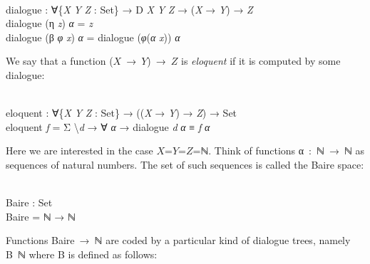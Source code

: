 \documentclass{entcs} \usepackage{prentcsmacro}
\newcommand{\AgdaC}[1]{\mbox{#1}}
\newcommand{\AgdaFontStyle}[1]{\textsf{#1}}
\newcommand{\AgdaBoundFontStyle}[1]{\textit{#1}}
\newcommand{\AgdaSymbol}      [1]{\textcolor{AgdaSymbol}{#1}}
\newcommand{\AgdaPrimitiveType}[1]
    {\AgdaFontStyle{\textcolor{AgdaPrimitiveType}{#1}}}
\newcommand{\AgdaBound}    [1]{\AgdaBoundFontStyle{\textcolor{AgdaBound}{#1}}}
\newcommand{\AgdaInductiveConstructor}[1]
    {\AgdaFontStyle{\textcolor{AgdaInductiveConstructor}{#1}}}
\newcommand{\AgdaDatatype} [1]{\AgdaFontStyle{\textcolor{AgdaDatatype}{#1}}}
\newcommand{\AgdaFunction} [1]{\AgdaFontStyle{\textcolor{AgdaFunction}{#1}}}
\newcommand{\AgdaCodeStyle}{\small}
\newenvironment{code}%
{\noindent\AgdaCodeStyle\pboxed}%
{\endpboxed\par\noindent%
\ignorespacesafterend}
\begin{document}
\begin{code}\>\<%
\\
\>\AgdaFunction{dialogue} \AgdaSymbol{:} \AgdaSymbol{∀\{}\AgdaBound{X} \AgdaBound{Y} \AgdaBound{Z} \AgdaSymbol{:} \AgdaPrimitiveType{Set}\AgdaSymbol{\}} \AgdaSymbol{→} \AgdaDatatype{D} \AgdaBound{X} \AgdaBound{Y} \AgdaBound{Z} \AgdaSymbol{→} \AgdaSymbol{(}\AgdaBound{X} \AgdaSymbol{→} \AgdaBound{Y}\AgdaSymbol{)} \AgdaSymbol{→} \AgdaBound{Z}\<%
\\
\>\AgdaFunction{dialogue} \AgdaSymbol{(}\AgdaInductiveConstructor{η} \AgdaBound{z}\AgdaSymbol{)} \<[17]%
\>[17]\AgdaBound{α} \AgdaSymbol{=} \AgdaBound{z}\<%
\\
\>\AgdaFunction{dialogue} \AgdaSymbol{(}\AgdaInductiveConstructor{β} \AgdaBound{φ} \AgdaBound{x}\AgdaSymbol{)} \AgdaBound{α} \AgdaSymbol{=} \AgdaFunction{dialogue} \AgdaSymbol{(}\AgdaBound{φ}\AgdaSymbol{(}\AgdaBound{α} \AgdaBound{x}\AgdaSymbol{))} \AgdaBound{α}\<%
\\
\>\<\end{code}
We say that a function \AgdaC{($X$ → $Y$) → $Z$} is \emph{eloquent} if
it is computed by some dialogue:

\begin{code}\>\<%
\\
\>\AgdaFunction{eloquent} \AgdaSymbol{:} \AgdaSymbol{∀\{}\AgdaBound{X} \AgdaBound{Y} \AgdaBound{Z} \AgdaSymbol{:} \AgdaPrimitiveType{Set}\AgdaSymbol{\}} \AgdaSymbol{→} \AgdaSymbol{((}\AgdaBound{X} \AgdaSymbol{→} \AgdaBound{Y}\AgdaSymbol{)} \AgdaSymbol{→} \AgdaBound{Z}\AgdaSymbol{)} \AgdaSymbol{→} \AgdaPrimitiveType{Set}\<%
\\
\>\AgdaFunction{eloquent} \AgdaBound{f} \AgdaSymbol{=} \AgdaDatatype{Σ} \AgdaSymbol{	\textbackslash}\AgdaBound{d} \AgdaSymbol{→} \AgdaSymbol{∀} \AgdaBound{α} \AgdaSymbol{→} \AgdaFunction{dialogue} \AgdaBound{d} \AgdaBound{α} \AgdaDatatype{≡} \AgdaBound{f} \AgdaBound{α}\<%
\\
\>\<\end{code}
Here we are interested in the case \AgdaC{$X$=$Y$=$Z$=ℕ}.
Think of functions \AgdaC{α : ℕ → ℕ} as sequences of natural
numbers. The set of such sequences is called the Baire space:

\begin{code}\>\<%
\\
\>\AgdaFunction{Baire} \AgdaSymbol{:} \AgdaPrimitiveType{Set}\<%
\\
\>\AgdaFunction{Baire} \AgdaSymbol{=} \AgdaDatatype{ℕ} \AgdaSymbol{→} \AgdaDatatype{ℕ}\<%
\\
\>\<\end{code}
Functions \AgdaC{Baire → ℕ} are coded by a particular kind of dialogue trees,
namely \AgdaC{B ℕ} where B is defined as follows:
\end{document}
